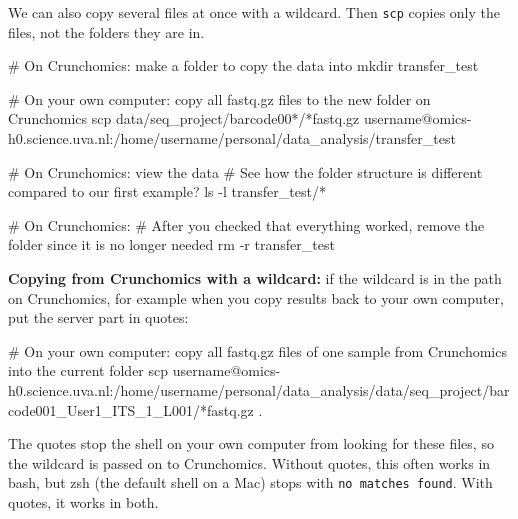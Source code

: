 \documentclass[
  letterpaper,
  DIV=11,
  numbers=noendperiod]{scrreprt}
\newenvironment{Shaded}{}{}
\newcommand{\AttributeTok}[1]{\textcolor[rgb]{0.84,0.23,0.29}{#1}}
\newcommand{\CommentTok}[1]{\textcolor[rgb]{0.42,0.45,0.49}{#1}}
\newcommand{\FunctionTok}[1]{\textcolor[rgb]{0.44,0.26,0.76}{#1}}
\newcommand{\NormalTok}[1]{\textcolor[rgb]{0.14,0.16,0.18}{#1}}
\newcommand{\PreprocessorTok}[1]{\textcolor[rgb]{0.84,0.23,0.29}{#1}}
\newcommand{\StringTok}[1]{\textcolor[rgb]{0.01,0.18,0.38}{#1}}
\begin{document}
\begin{tcolorbox}[enhanced jigsaw, colbacktitle=quarto-callout-tip-color!10!white, rightrule=.15mm, leftrule=.75mm, colback=white, opacitybacktitle=0.6, title=\textcolor{quarto-callout-tip-color}{\faLightbulb}\hspace{0.5em}{Tip: Moving files with wildcards (optional)}, bottomrule=.15mm, left=2mm, colframe=quarto-callout-tip-color-frame, opacityback=0, breakable, bottomtitle=1mm, coltitle=black, arc=.35mm, toprule=.15mm, toptitle=1mm, titlerule=0mm]

We can also copy several files at once with a wildcard. Then
\texttt{scp} copies only the files, not the folders they are in.

\begin{Shaded}
\begin{Highlighting}[]
\CommentTok{\# On Crunchomics: make a folder to copy the data into}
\FunctionTok{mkdir}\NormalTok{ transfer\_test}

\CommentTok{\# On your own computer: copy all fastq.gz files to the new folder on Crunchomics}
\FunctionTok{scp}\NormalTok{ data/seq\_project/barcode00}\PreprocessorTok{*}\NormalTok{/}\PreprocessorTok{*}\NormalTok{fastq.gz username@omics{-}h0.science.uva.nl:/home/username/personal/data\_analysis/transfer\_test}

\CommentTok{\# On Crunchomics: view the data}
\CommentTok{\# See how the folder structure is different compared to our first example?}
\FunctionTok{ls} \AttributeTok{{-}l}\NormalTok{ transfer\_test/}\PreprocessorTok{*}

\CommentTok{\# On Crunchomics:}
\CommentTok{\# After you checked that everything worked, remove the folder since it is no longer needed }
\FunctionTok{rm} \AttributeTok{{-}r}\NormalTok{ transfer\_test}
\end{Highlighting}
\end{Shaded}

\textbf{Copying from Crunchomics with a wildcard:} if the wildcard is in
the path on Crunchomics, for example when you copy results back to your
own computer, put the server part in quotes:

\begin{Shaded}
\begin{Highlighting}[]
\CommentTok{\# On your own computer: copy all fastq.gz files of one sample from Crunchomics into the current folder}
\FunctionTok{scp} \StringTok{\textquotesingle{}username@omics{-}h0.science.uva.nl:/home/username/personal/data\_analysis/data/seq\_project/barcode001\_User1\_ITS\_1\_L001/*fastq.gz\textquotesingle{}}\NormalTok{ .}
\end{Highlighting}
\end{Shaded}

The quotes stop the shell on your own computer from looking for these
files, so the wildcard is passed on to Crunchomics. Without quotes, this
often works in bash, but zsh (the default shell on a Mac) stops with
\texttt{no\ matches\ found}. With quotes, it works in both.

\end{tcolorbox}
\end{document}
